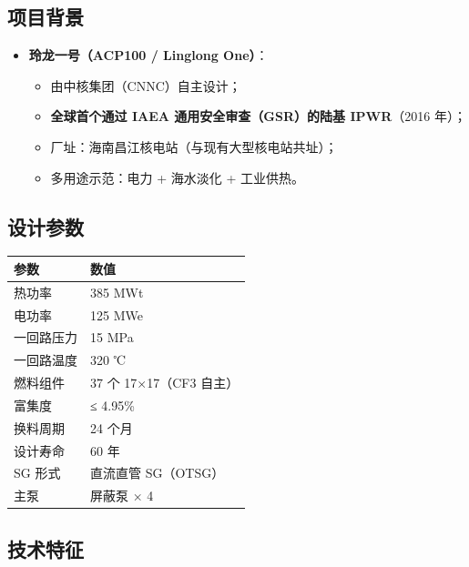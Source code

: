\documentclass[
  UTF8,
  scheme=plain,
  fontsize=10pt,
  openany
]{ctexbook}
\begin{document}
\subsection{项目背景}\label{ux9879ux76eeux80ccux666f-1}

\begin{itemize}
\tightlist
\item
  \textbf{玲龙一号（ACP100 / Linglong One）}：

  \begin{itemize}
  \tightlist
  \item
    由中核集团（CNNC）自主设计；
  \item
    \textbf{全球首个通过 IAEA 通用安全审查（GSR）的陆基 IPWR}（2016
    年）；
  \item
    厂址：海南昌江核电站（与现有大型核电站共址）；
  \item
    多用途示范：电力 + 海水淡化 + 工业供热。
  \end{itemize}
\end{itemize}

\subsection{设计参数}\label{ux8bbeux8ba1ux53c2ux6570-1}

{\def\LTcaptype{none} %
\begin{longtable}[]{@{}ll@{}}
\toprule\noalign{}
参数 & 数值 \\
\midrule\noalign{}
\endhead
\bottomrule\noalign{}
\endlastfoot
热功率 & 385 MWt \\
电功率 & 125 MWe \\
一回路压力 & 15 MPa \\
一回路温度 & 320 ℃ \\
燃料组件 & 37 个 17×17（CF3 自主） \\
富集度 & ≤ 4.95\% \\
换料周期 & 24 个月 \\
设计寿命 & 60 年 \\
SG 形式 & 直流直管 SG（OTSG） \\
主泵 & 屏蔽泵 × 4 \\
\end{longtable}
}

\subsection{技术特征}\label{ux6280ux672fux7279ux5f81-1}
\end{document}
